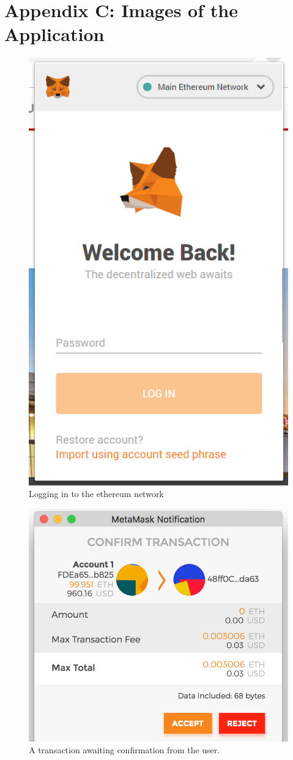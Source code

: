 \section{Appendix C: Images of the Application}
\begin{figure}[H]
\center
\includegraphics[scale=0.6]{images/metamasklogin.png}
\caption{Logging in to the ethereum network}
\end{figure}

\begin{figure}[H]
\center
\includegraphics[scale=0.4]{images/MetamaskNotification.png}
\caption{A transaction awaiting confirmation from the user.}
\end{figure}